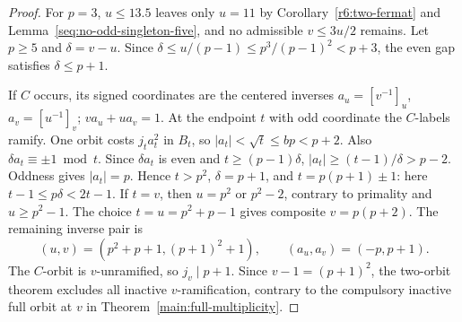 \documentclass[11pt,a4paper]{article}
\numberwithin{equation}{section}
\theoremstyle{remark}
\begin{document}
\begin{proof}
For $p=3$, $u\le13.5$ leaves only $u=11$ by
Corollary~\ref{r6:two-fermat} and Lemma~\ref{seq:no-odd-singleton-five},
and no admissible $v\le3u/2$ remains. Let $p\ge5$ and
$\delta=v-u$. Since $\delta\le u/(p-1)\le p^3/(p-1)^2<p+3$,
the even gap satisfies $\delta\le p+1$.

If $C$ occurs, its signed coordinates are the centered inverses
$a_u=[v^{-1}]_u$, $a_v=[u^{-1}]_v$; $va_u+ua_v=1$.
At the endpoint $t$ with odd coordinate the $C$-labels ramify.
One orbit costs $j_t a_t^2$ in $B_t$, so
$|a_t|<\sqrt t\le bp<p+2$. Also $\delta a_t\equiv\pm1\bmod t$.
Since $\delta a_t$ is even and $t\ge(p-1)\delta$,
$|a_t|\ge(t-1)/\delta>p-2$. Oddness gives $|a_t|=p$.
Hence $t>p^2$, $\delta=p+1$, and $t=p(p+1)\pm1$: here
$t-1\le p\delta<2t-1$. If $t=v$, then $u=p^2$ or $p^2-2$,
contrary to primality and $u\ge p^2-1$. The choice $t=u=p^2+p-1$
gives composite $v=p(p+2)$. The remaining inverse pair is
\[
 (u,v)=(p^2+p+1,(p+1)^2+1),\qquad (a_u,a_v)=(-p,p+1).
\]
The $C$-orbit is $v$-unramified, so $j_v\mid p+1$. Since
$v-1=(p+1)^2$, the two-orbit theorem excludes all inactive
$v$-ramification, contrary to the compulsory inactive full orbit at $v$
in Theorem~\ref{main:full-multiplicity}.
\end{proof}
\end{document}

